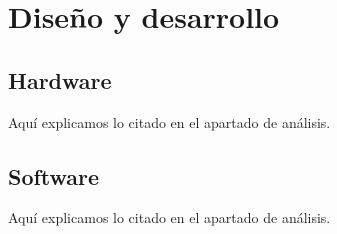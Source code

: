 \chapter{Diseño y desarrollo}

\section{Hardware}
Aquí explicamos lo citado en el apartado de análisis.

\section{Software}
Aquí explicamos lo citado en el apartado de análisis.